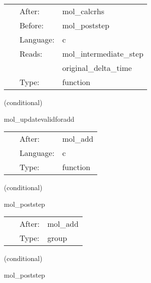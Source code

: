  \begin{tabular*}{160mm}{cll} 
~ & After:  & mol\_calcrhs \\ 
~ & Before:  & mol\_poststep \\ 
~ & Language:  & c \\ 
~ & Reads:  & mol\_intermediate\_step \\ 
~& ~ &original\_delta\_time\\ 
~ & Type:  & function \\ 
\end{tabular*} 


\vspace{5mm}

   (conditional) 

\hspace{5mm} mol\_updatevalidforadd 

\hspace{5mm}{\it automatically update valid regions based on mol } 


\hspace{5mm}

 \begin{tabular*}{160mm}{cll} 
~ & After:  & mol\_add \\ 
~ & Language:  & c \\ 
~ & Type:  & function \\ 
\end{tabular*} 


\vspace{5mm}

   (conditional) 

\hspace{5mm} mol\_poststep 

\hspace{5mm}{\it the group for physics thorns to schedule boundary calls etc. } 


\hspace{5mm}

 \begin{tabular*}{160mm}{cll} 
~ & After:  & mol\_add \\ 
~ & Type:  & group \\ 
\end{tabular*} 


\vspace{5mm}

   (conditional) 

\hspace{5mm} mol\_poststep 

